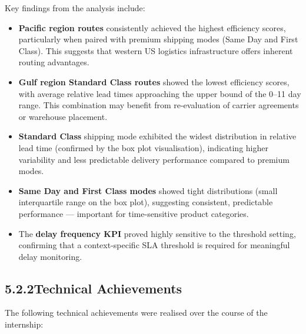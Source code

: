 \documentclass[12pt, a4paper]{report}
\begin{document}
Key findings from the analysis include:

\begin{itemize}[leftmargin=1.5em, itemsep=6pt]
  \item \textbf{Pacific region routes} consistently achieved the highest
    efficiency scores, particularly when paired with premium shipping modes
    (Same Day and First Class). This suggests that western US logistics
    infrastructure offers inherent routing advantages.

  \item \textbf{Gulf region Standard Class routes} showed the lowest
    efficiency scores, with average relative lead times approaching the
    upper bound of the 0--11 day range. This combination may benefit from
    re-evaluation of carrier agreements or warehouse placement.

  \item \textbf{Standard Class} shipping mode exhibited the widest
    distribution in relative lead time (confirmed by the box plot
    visualisation), indicating higher variability and less predictable
    delivery performance compared to premium modes.

  \item \textbf{Same Day and First Class modes} showed tight distributions
    (small interquartile range on the box plot), suggesting consistent,
    predictable performance — important for time-sensitive product categories.

  \item The \textbf{delay frequency KPI} proved highly sensitive to the
    threshold setting, confirming that a context-specific SLA threshold
    is required for meaningful delay monitoring.
\end{itemize}

\subsection*{5.2.2\quad Technical Achievements}

The following technical achievements were realised over the course of the
internship:
\end{document}
